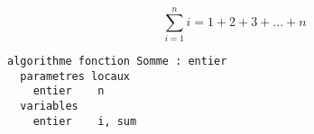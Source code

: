 \documentclass[11pt,a4paper]{article}
\begin{document}
\begin{center}
\begin{equation*}
\sum^{n}_{i = 1} i = 1 + 2 + 3 + ... + n
\end{equation*}
\end{center}


\begin{table}[h!]
  \centering
  \begin{minipage}{0.59\textwidth}
    \centering
\begin{lstlisting}[style=algorithm]
algorithme fonction Somme : entier
  parametres locaux
    entier    n
  variables
    entier    i, sum


\end{lstlisting}
\end{minipage}
\end{table}
\end{document}
